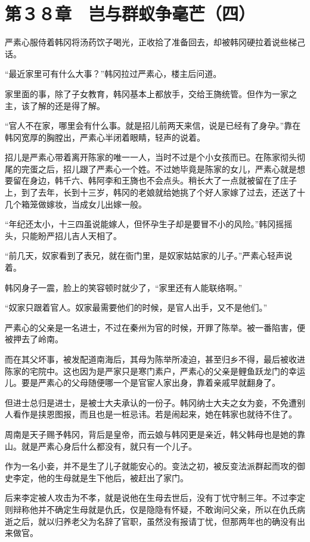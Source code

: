 \section{第３８章　岂与群蚁争毫芒（四）}

严素心服侍着韩冈将汤药饮子喝光，正收拾了准备回去，却被韩冈硬拉着说些梯己话。

“最近家里可有什么大事？”韩冈拉过严素心，楼主后问道。

家里面的事，除了子女教育，韩冈基本上都放手，交给王旖统管。但作为一家之主，该了解的还是得了解。

“官人不在家，哪里会有什么事。就是招儿前两天来信，说是已经有了身孕。”靠在韩冈宽厚的胸膛出，严素心半闭着眼睛，轻声的说着。

招儿是严素心带着离开陈家的唯一一人，当时不过是个小女孩而已。在陈家彻头彻尾的完蛋之后，招儿跟了严素心一个姓。不过她毕竟是陈家的女儿，严素心就是想要留在身边，韩千六、韩阿李和王旖也不会点头。稍长大了一点就被留在了庄子上，到了去年，长到十三岁，韩冈的老娘就给她挑了个好人家嫁了过去，还送了十几个箱笼做嫁妆，当成女儿出嫁一般。

“年纪还太小，十三四虽说能嫁人，但怀孕生子却是要冒不小的风险。”韩冈摇摇头，只能盼严招儿吉人天相了。

“前几天，奴家看到了表兄，就在衙门里，是奴家姑姑家的儿子。”严素心轻声说着。

韩冈身子一震，脸上的笑容顿时就少了，“家里还有人能联络啊。”

“奴家只跟着官人。奴家最需要他们的时候，是官人出手，又不是他们。”

严素心的父亲是一名进士，不过在秦州为官的时候，开罪了陈举。被一番陷害，便被押去了岭南。

而在其父坏事，被发配道南海后，其母为陈举所凌迫，甚至归乡不得，最后被收进陈家的宅院中。这也因为是严家只是寒门素户，严素心的父亲是鲤鱼跃龙门的幸运儿。要是严素心的父母随便哪一个是官宦人家出身，靠着亲戚早就翻身了。

但进士总归是进士，是被士大夫承认的一份子。韩冈纳士大夫之女为妾，不免遭别人看作是挟恩图报，而且也是一桩忌讳。若是闹起来，她在韩家也就待不住了。

周南是天子赐予韩冈，背后是皇帝，而云娘与韩冈更是亲近，韩父韩母也是她的靠山。就是严素心身后什么都没有，就只有一个儿子。

作为一名小妾，并不是生了儿子就能安心的。变法之初，被反变法派群起而攻的御史李定，他的生母就是生下他后，被赶出了家门。

后来李定被人攻击为不孝，就是说他在生母去世后，没有丁忧守制三年。不过李定则辩称他并不确定生母就是仇氏，仅是隐隐有怀疑，不敢询问父亲，所以在仇氏病逝之后，就以归养老父为名辞了官职，虽然没有报请丁忧，但那两年也的确没有出来做官。

